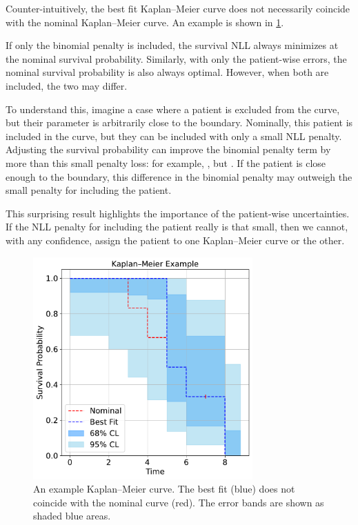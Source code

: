 \documentclass[article]{jss}
\newcommand{\KM}{Kaplan--Meier} %
\begin{document}
Counter-intuitively, the best fit \KM{} curve does not necessarily coincide with the nominal \KM{} curve.  An example is shown in \cref{fig:best-fit-vs-nominal}.

If only the binomial penalty is included, the survival NLL always minimizes at the nominal survival probability.  Similarly, with only the patient-wise errors, the nominal survival probability is also always optimal.  However, when both are included, the two may differ.

To understand this, imagine a case where a patient is excluded from the curve, but their parameter is arbitrarily close to the boundary.  Nominally, this patient is included in the curve, but they can be included with only a small NLL penalty.  Adjusting the survival probability can improve the binomial penalty term by more than this small penalty loss:
for example, , but . %
If the patient is close enough to the boundary, this difference in the binomial penalty may outweigh the small penalty for including the patient.

This surprising result highlights the importance of the patient-wise uncertainties.  If the NLL penalty for including the patient really is that small, then we cannot, with any confidence, assign the patient to one \KM{} curve or the other.

\begin{figure}
  \centering
  \includegraphics[width=0.75\textwidth]{km_example.pdf}
  \caption{\label{fig:best-fit-vs-nominal} An example \KM{} curve.  The best fit (blue) does not coincide with the nominal curve (red).  The error bands are shown as shaded blue areas.}
\end{figure}
\end{document}

